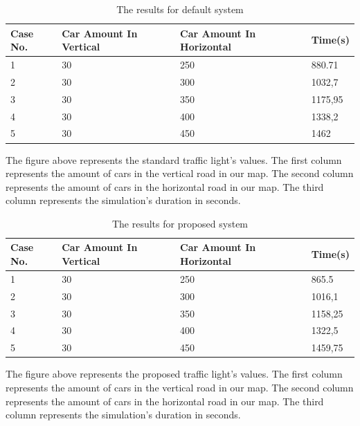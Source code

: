 \documentclass[conference]{IEEEtran}
\begin{document}
    \begin{table}[h!]
        \centering
    	\begin{tabular}{||p{0.5cm} p{2cm} p{2cm} p{1cm}||} 
    		\hline
    		\textbf{Case No.} & \textbf{Car Amount In Vertical} & \textbf{Car Amount In Horizontal} & \textbf{Time(s)} \\ [0.5ex] 
    		\hline\hline
    		1        & 30                     & 250                      & 880.71  \\ 
    		\hline
    		2        & 30                     & 300                      & 1032,7  \\
    		\hline
    		3        & 30                     & 350                      & 1175,95 \\
    		\hline
    		4        & 30                     & 400                      & 1338,2  \\
    		\hline
    		5        & 30                     & 450                      & 1462    \\
    		\hline
    	\end{tabular}
    	\newline
    	\caption{The results for default system}
    	\label{fig:my_label}
    \end{table}

The figure above represents the standard traffic light's values. The first column represents the amount of cars in the vertical road in our map. The second column represents the amount of cars in the horizontal road in our map. The third column represents the simulation's duration in seconds.
\begin{table}[h!]
	\centering
	\begin{tabular}{||p{0.5cm} p{2cm} p{2cm} p{1cm}||} 
		\hline
		\textbf{Case No.} & \textbf{Car Amount In Vertical} & \textbf{Car Amount In Horizontal} & \textbf{Time(s)} \\ [0.5ex] 
		\hline\hline
		1        & 30                     & 250                      & 865.5   \\ 
		\hline
		2        & 30                     & 300                      & 1016,1  \\
		\hline
		3        & 30                     & 350                      & 1158,25 \\
		\hline
		4        & 30                     & 400                      & 1322,5  \\
		\hline
		5        & 30                     & 450                      & 1459,75 \\
		\hline
		
	\end{tabular}
	\newline
    \caption{The results for proposed system}
    \label{fig:my_label}
\end{table}
\newline
\par The figure above represents the proposed traffic light's values. The first column represents the amount of cars in the vertical road in our map. The second column represents the amount of cars in the horizontal road in our map. The third column represents the simulation's duration in seconds.
\end{document}
